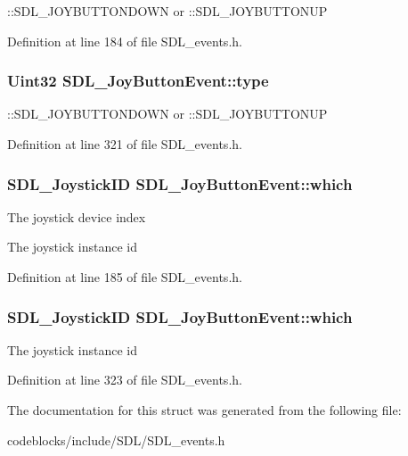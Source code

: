 \+::\+S\+D\+L\+\_\+\+J\+O\+Y\+B\+U\+T\+T\+O\+N\+D\+O\+W\+N or \+::\+S\+D\+L\+\_\+\+J\+O\+Y\+B\+U\+T\+T\+O\+N\+U\+P 

Definition at line 184 of file S\+D\+L\+\_\+events.\+h.

\hypertarget{structSDL__JoyButtonEvent_a8f3312a046d37fa2884b93f69c4cb655}{
\subsubsection[{type}]{\setlength{\rightskip}{0pt plus 5cm}Uint32 S\+D\+L\+\_\+\+Joy\+Button\+Event\+::type}}\label{structSDL__JoyButtonEvent_a8f3312a046d37fa2884b93f69c4cb655}
\+::\+S\+D\+L\+\_\+\+J\+O\+Y\+B\+U\+T\+T\+O\+N\+D\+O\+W\+N or \+::\+S\+D\+L\+\_\+\+J\+O\+Y\+B\+U\+T\+T\+O\+N\+U\+P 

Definition at line 321 of file S\+D\+L\+\_\+events.\+h.

\hypertarget{structSDL__JoyButtonEvent_a1679049adad7242b28420948fdc79044}{
\subsubsection[{which}]{\setlength{\rightskip}{0pt plus 5cm}S\+D\+L\+\_\+\+Joystick\+I\+D S\+D\+L\+\_\+\+Joy\+Button\+Event\+::which}}\label{structSDL__JoyButtonEvent_a1679049adad7242b28420948fdc79044}
The joystick device index

The joystick instance id 

Definition at line 185 of file S\+D\+L\+\_\+events.\+h.

\hypertarget{structSDL__JoyButtonEvent_a1679049adad7242b28420948fdc79044}{
\subsubsection[{which}]{\setlength{\rightskip}{0pt plus 5cm}S\+D\+L\+\_\+\+Joystick\+I\+D S\+D\+L\+\_\+\+Joy\+Button\+Event\+::which}}\label{structSDL__JoyButtonEvent_a1679049adad7242b28420948fdc79044}
The joystick instance id 

Definition at line 323 of file S\+D\+L\+\_\+events.\+h.



The documentation for this struct was generated from the following file\+:\begin{DoxyCompactItemize}
\item 
codeblocks/include/\+S\+D\+L/S\+D\+L\+\_\+events.\+h\end{DoxyCompactItemize}
